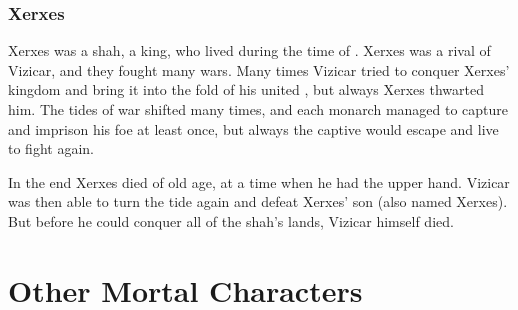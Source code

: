\section{Xerxes}
Xerxes was a shah, a king, who lived during the time of \VizicarDurasRespina. 
Xerxes was a rival of Vizicar, and they fought many wars. 
Many times Vizicar tried to conquer Xerxes' kingdom and bring it into the fold of his united \VaimonCaliphate, but always Xerxes thwarted him. 
The tides of war shifted many times, and each monarch managed to capture and imprison his foe at least once, but always the captive would escape and live to fight again. 

In the end Xerxes died of old age, at a time when he had the upper hand. 
Vizicar was then able to turn the tide again and defeat Xerxes' son (also named Xerxes).
But before he could conquer all of the shah's lands, Vizicar himself died. 












































\part{Other Mortal Characters}























